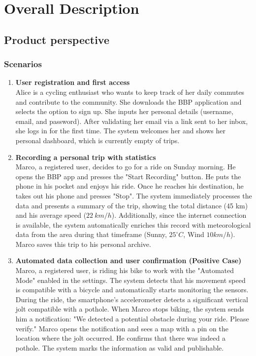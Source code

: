 \section{Overall Description}

\subsection{Product perspective}

\subsubsection{Scenarios}

\begin{enumerate}
    \item \textbf{User registration and first access} \\
    Alice is a cycling enthusiast who wants to keep track of her daily commutes and contribute to the community. She downloads the BBP application and selects the option to sign up. She inputs her personal details (username, email, and password). After validating her email via a link sent to her inbox, she logs in for the first time. The system welcomes her and shows her personal dashboard, which is currently empty of trips.

    \item \textbf{Recording a personal trip with statistics} \\
    Marco, a registered user, decides to go for a ride on Sunday morning. He opens the BBP app and presses the "Start Recording" button. He puts the phone in his pocket and enjoys his ride. Once he reaches his destination, he takes out his phone and presses "Stop". The system immediately processes the data and presents a summary of the trip, showing the total distance (45 km) and his average speed ($22~km/h$). Additionally, since the internet connection is available, the system automatically enriches this record with meteorological data from the area during that timeframe (Sunny, $25^{\circ}C$, Wind $10km/h$). Marco saves this trip to his personal archive.

    \item \textbf{Automated data collection and user confirmation (Positive Case)} \\
    Marco, a registered user, is riding his bike to work with the "Automated Mode" enabled in the settings. The system detects that his movement speed is compatible with a bicycle and automatically starts monitoring the sensors. During the ride, the smartphone's accelerometer detects a significant vertical jolt compatible with a pothole. When Marco stops biking, the system sends him a notification: "We detected a potential obstacle during your ride. Please verify." Marco opens the notification and sees a map with a pin on the location where the jolt occurred. He confirms that there was indeed a pothole. The system marks the information as valid and publishable.


\end{enumerate}
